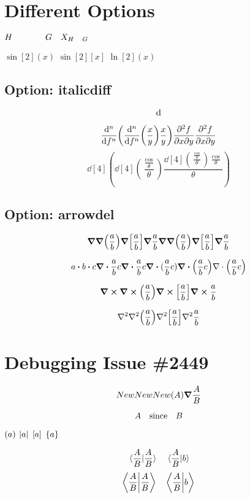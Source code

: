 \documentclass{article}
\begin{document}
\section*{Different Options}
\def\hh{H\hspace{1em}\nonscript\hspace{1cm}G}

$\hh\quad X_{\hh}$

$\sin[2](x)$
$\sin[2][x]$
$\ln[2](x)$


\subsection*{Option: italicdiff}
\[
\diffd
\]

\[
  \dv[n]{f}(\dv[n]{f}(\frac{x}{y})\frac{x}{y})
  \pdv[n]{f}{x}{y}(\pdv[n]{f}{x}{y}(\frac{x}{y})\frac{x}{y})
  \pdv{f}{x}{y}(\pdv{f}{x}{y}(\frac{x}{y})\frac{x}{y})
\]
\[
  \dd[4](\dd[4](\frac{\frac{\cos}{\theta}}{\theta})\frac{\dd[4](\frac{\frac{\cos}{\theta}}{\theta})\frac{\cos}{\theta}}{\theta})
\]

\subsection*{Option: arrowdel}


\[
  \gradient 
  \gradient(\frac{a}{b})
  \gradient[\frac{a}{b}]
  \gradient{\frac{a}{b}}
  \grad 
  \grad(\frac{a}{b})
  \grad[\frac{a}{b}]
  \grad{\frac{a}{b}}
\]

\[
  a\dotproduct b \vdot c
  \divergence{\frac{a}{b}c}
  \div{\frac{a}{b}c}
  \div{(\frac{a}{b}c)}
  \div(\frac{a}{b}c)
  {\bf\nabla} \cdot \left(\frac{a}{b}c\right)
\]

\[
  \curl 
  \curl(\frac{a}{b})
  \curl[\frac{a}{b}]
  \curl{\frac{a}{b}}
\]

\[
  \laplacian 
  \laplacian(\frac{a}{b})
  \laplacian[\frac{a}{b}]
  \laplacian{\frac{a}{b}}
\]




\newpage

\section*{Debugging Issue \#2449}

\[\Residue \Res \Res(A) \grad{\frac{A}{B}}\]


\[A \qsince B\]

\(\pqty {a}\)  \(\vqty {a}\)  \(\bqty {a}\)  \(\Bqty {a}\)

  
  \[
\ip*{\frac {A}{B}} \quad \ip*{\frac {A}{B}}{b}
\]
\[
\ip{\frac{A}{B}} \quad \ip{\frac{A}{B}}{b}
\]
  
\end{document}

